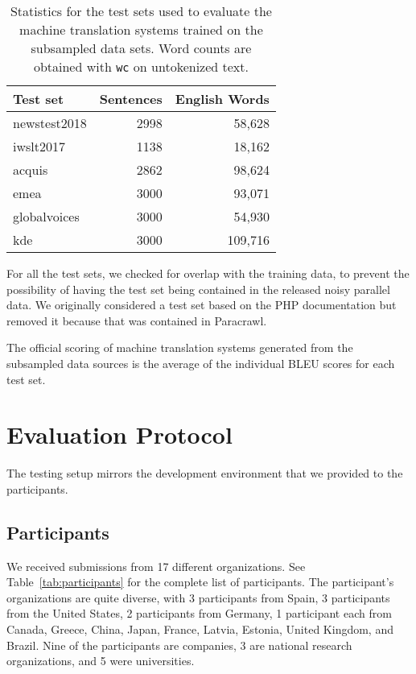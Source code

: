 \documentclass[11pt,a4paper]{article}
\begin{document}
\begin{table}
    \centering
    \begin{tabular}{|l|r|r|} \hline
    \bf Test set & Sentences & English Words \\ \hline
    \sc newstest2018  & 2998 & 58,628 \\
    \sc iwslt2017     & 1138 & 18,162 \\
    \sc acquis        & 2862 & 98,624 \\
    \sc emea          & 3000 & 93,071 \\
    \sc globalvoices  & 3000 & 54,930 \\
    \sc kde           & 3000 & 109,716 \\ \hline
    \end{tabular}
    \caption{Statistics for the test sets used to evaluate the machine translation systems trained on the subsampled data sets. Word counts are obtained with {\tt wc} on untokenized text.}
    \label{tab:statistics}
\end{table}

For all the test sets, we checked for overlap with the training data, to prevent the possibility of having the test set being contained in the released noisy parallel data. We originally considered a test set based on the PHP documentation but removed it because that was contained in Paracrawl.

The official scoring of machine translation systems generated from the subsampled data sources is the average of the individual BLEU scores for each test set.

\section{Evaluation Protocol}
The testing setup mirrors the development environment that we provided to the participants.

\subsection{Participants}
We received submissions from 17 different organizations. See
Table~\ref{tab:participants} for the complete list of participants. The participant's organizations are quite diverse, with 3 participants from Spain, 3 participants from the United States, 2 participants from Germany, 1 participant each from Canada, Greece, China, Japan, France, Latvia, Estonia, United Kingdom, and Brazil. Nine of the participants are companies, 3 are national research organizations, and 5 were universities.
\end{document}
